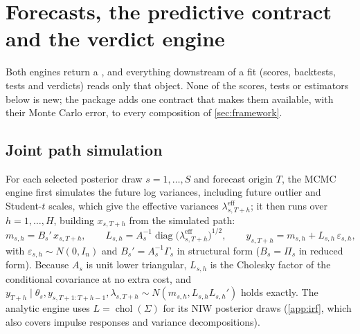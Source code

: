\section{Forecasts, the predictive contract and the verdict engine}\label{sec:evaluation}\label{sec:forecasts}

Both engines return a , and everything downstream of a fit (scores,
backtests, tests and verdicts) reads only that object.
None of the scores, tests or estimators below is new; the package adds one contract that makes
them available, with their Monte Carlo error, to every composition of \cref{sec:framework}.

\subsection{Joint path simulation}\label{sec:eval-paths}

For each selected posterior draw $s = 1, \dots, S$ and forecast origin $T$, the MCMC engine first
simulates the future log variances, including future outlier and Student-$t$ scales, which give
the effective variances
$\lambda^{\mathrm{eff}}_{s,T+h}$; it then runs over $h = 1, \dots, H$, building $x_{s,T+h}$ from
the simulated path:
\begin{equation}\label{eq:forecast-recursion}
  m_{s,h} = B_s'\, x_{s,T+h},\qquad
  L_{s,h} = A_s^{-1}\operatorname{diag}\bigl(\lambda^{\mathrm{eff}}_{s,T+h}\bigr)^{1/2},\qquad
  y_{s,T+h} = m_{s,h} + L_{s,h}\,\varepsilon_{s,h},
\end{equation}
with $\varepsilon_{s,h} \sim N(0, I_n)$ and $B_s' = A_s^{-1}\Gamma_s$ in structural form ($B_s = \Pi_s$
in reduced form).
Because $A_s$ is unit lower triangular, $L_{s,h}$ is the Cholesky factor of the conditional
covariance at no extra cost, and $y_{T+h} \mid \theta_s, y_{s,T+1:T+h-1}, \lambda_{s,T+h} \sim
N(m_{s,h}, L_{s,h}L_{s,h}')$ holds exactly.
The analytic engine uses $L = \operatorname{chol}(\Sigma)$ for its NIW posterior draws
(\cref{app:irf}, which also covers impulse responses and variance decompositions).

